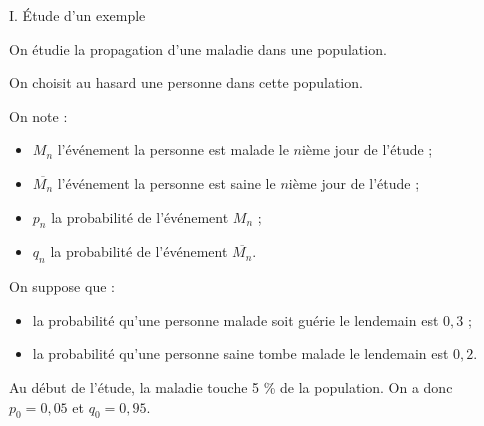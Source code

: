 
\begin{h2}I. Étude d'un exemple\end{h2}
On étudie la propagation d'une maladie dans une population.
\par
On choisit au hasard une personne dans cette population.
\par
On note :
\begin{itemize}
     \item $M_n$ l'événement \og la personne est malade le $n$ième jour de l'étude \fg{} ;
     \item $\overline{M_n}$ l'événement \og la personne est saine le $n$ième jour de l'étude \fg{} ;
     \item $p_n$ la probabilité de l'événement $M_n$ ;
     \item $q_n$ la probabilité de l'événement $\overline{M_n}$.
\end{itemize}
On suppose que :
\begin{itemize}
     \item la probabilité qu'une personne malade soit guérie le lendemain est $0,3$ ;
     \item la probabilité qu'une personne saine tombe malade le lendemain est $0,2$.
\end{itemize}
Au début de l'étude, la maladie touche 5 \% de la population. On a donc $p_0=0,05$ et $q_0=0,95$.
